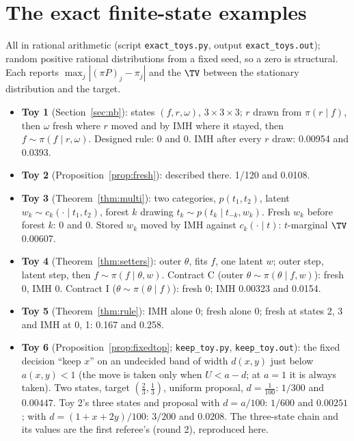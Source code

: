 \section{The exact finite-state examples}\label{app:toys}

All in rational arithmetic (script \texttt{exact\_toys.py}, output \texttt{exact\_toys.out}); random positive
rational distributions from a fixed seed, so a zero is structural. Each reports $\max_j|(\pi P)_j-\pi_j|$ and the
$\TV$ between the stationary distribution and the target.
\begin{itemize}
\item \textbf{Toy 1} (Section~\ref{sec:nb}): states $(f,r,\omega)$, $3\times3\times3$; $r$ drawn from
$\pi(r\mid f)$, then $\omega$ fresh where $r$ moved and by IMH where it stayed, then $f\sim\pi(f\mid r,\omega)$.
Designed rule: 0 and 0. IMH after every $r$ draw: 0.00954 and 0.0393.
\item \textbf{Toy 2} (Proposition~\ref{prop:fresh}): described there. 1/120 and 0.0108.
\item \textbf{Toy 3} (Theorem~\ref{thm:multi}): two categories, $p(t_1,t_2)$, latent $w_k\sim c_k(\cdot\mid t_1,
t_2)$, forest $k$ drawing $t_k\sim p(t_k\mid t_{-k},w_k)$. Fresh $w_k$ before forest $k$: 0 and 0. Stored $w_k$
moved by IMH against $c_k(\cdot\mid t)$: $t$-marginal $\TV$ 0.00607.
\item \textbf{Toy 4} (Theorem~\ref{thm:setters}): outer $\theta$, fits $f$, one latent $w$; outer step, latent
step, then $f\sim\pi(f\mid\theta,w)$. Contract C (outer $\theta\sim\pi(\theta\mid f,w)$): fresh 0, IMH 0.
Contract I ($\theta\sim\pi(\theta\mid f)$): fresh 0; IMH 0.00323 and 0.0154.
\item \textbf{Toy 5} (Theorem~\ref{thm:rule}): IMH alone 0; fresh alone 0; fresh at states 2, 3 and IMH at 0, 1:
0.167 and 0.258.
\item \textbf{Toy 6} (Proposition~\ref{prop:fixedtop}; \texttt{keep\_toy.py}, \texttt{keep\_toy.out}): the fixed
decision ``keep $x$'' on an undecided band of width $d(x,y)$ just below $a(x,y)<1$ (the move is taken only when
$U<a-d$; at $a=1$ it is always taken). Two states, target $(\frac23,\frac13)$, uniform proposal, $d=\frac1{100}$:
$1/300$ and $0.00447$. Toy 2's three states and proposal with $d=a/100$: $1/600$ and $0.00251$; with
$d=(1+x+2y)/100$: $3/200$ and $0.0208$. The three-state chain and its values are the first referee's (round 2),
reproduced here.
\end{itemize}

\sloppy
